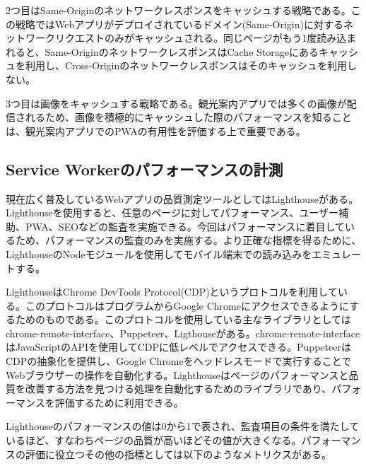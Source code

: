 2つ目はSame-Originのネットワークレスポンスをキャッシュする戦略である。この戦略ではWebアプリがデプロイされているドメイン(Same-Origin)に対するネットワークリクエストのみがキャッシュされる。同じページがもう1度読み込まれると、Same-OriginのネットワークレスポンスはCache Storageにあるキャッシュを利用し、Cross-Originのネットワークレスポンスはそのキャッシュを利用しない。

3つ目は画像をキャッシュする戦略である。観光案内アプリでは多くの画像が配信されるため、画像を積極的にキャッシュした際のパフォーマンスを知ることは、観光案内アプリでのPWAの有用性を評価する上で重要である。
\subsection{Service Workerのパフォーマンスの計測}
\label{subsubsection:Service Workerのパフォーマンスの計測}
現在広く普及しているWebアプリの品質測定ツールとしてはLighthouseがある。Lighthouseを使用すると、任意のページに対してパフォーマンス、ユーザー補助、PWA、SEOなどの監査を実施できる。今回はパフォーマンスに着目しているため、パフォーマンスの監査のみを実施する。より正確な指標を得るために、LighthouseのNodeモジュールを使用してモバイル端末での読み込みをエミュレートする。

LighthouseはChrome DevTools Protocol(CDP)というプロトコルを利用している。このプロトコルはプログラムからGoogle Chromeにアクセスできるようにするためのものである。このプロトコルを使用している主なライブラリとしてはchrome-remote-interface、Puppeteer、Ligthouseがある。chrome-remote-interfaceはJavaScriptのAPIを使用してCDPに低レベルでアクセスできる。PuppeteerはCDPの抽象化を提供し、Google Chromeをヘッドレスモードで実行することでWebブラウザーの操作を自動化する。Lighthouseはページのパフォーマンスと品質を改善する方法を見つける処理を自動化するためのライブラリであり、パフォーマンスを評価するために利用できる。

Lighthouseのパフォーマンスの値は0から1で表され、監査項目の条件を満たしているほど、すなわちページの品質が高いほどその値が大きくなる。パフォーマンスの評価に役立つその他の指標としては以下のようなメトリクスがある。

